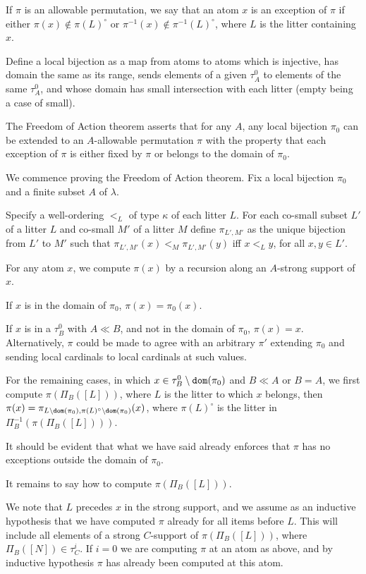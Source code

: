 \documentclass[12pt]{article}
\begin{document}
If $\pi$ is an allowable permutation, we say that an atom $x$ is
an exception of $\pi$ if either $\pi(x) \not\in \pi(L)^{\circ}$ or $\pi^{-1}(x) \not\in \pi^{-1}(L)^\circ$, where $L$ is the litter containing $x$.

Define a local bijection as a map from atoms to atoms which is injective, has domain the same as its range,  sends elements of a given $\tau^0_A$ to elements of the same
$\tau^0_A$, and whose domain has small intersection with each litter (empty being a case of small).



The Freedom of Action theorem asserts that for any $A$, any local bijection $\pi_0$ %
can be extended to an $A$-allowable permutation $\pi$ with the property that each exception of $\pi$ is either
fixed by $\pi$ or belongs to the domain of $\pi_0$.

We commence proving the Freedom of Action theorem.  Fix a local bijection $\pi_0$ and a finite subset $A$ of $\lambda$. 

Specify a well-ordering $<_L$ of type $\kappa$ of each litter $L$.  For each co-small subset $L'$ of a litter $L$ and co-small $M'$ of a litter $M$ define $\pi_{L',M'}$ as
the unique bijection from $L'$ to $M'$ such that $\pi_{L',M'}(x) <_M \pi_{L',M'}(y)$ iff $x <_L y$, for all $x,y \in L'$.  

For any atom $x$, we compute $\pi(x)$ by a recursion along an $A$-strong support of $x$. 

If $x$ is in the domain of $\pi_0$, $\pi(x) = \pi_0(x)$.

If $x$ is in a $\tau^0_B$ with $A \ll B$, and not in the domain of $\pi_0$, $\pi(x)=x$.  Alternatively, $\pi$ could be made to agree with an arbitrary $\pi'$ extending $\pi_0$ and sending local cardinals to local cardinals at such values.

For the remaining cases, in which $x \in \tau^0_B \setminus {\tt dom}(\pi_0)$ and $B \ll A$ or $B=A$, we first compute $\pi(\Pi_B([L]))$, where $L$ is the litter to which $x$ belongs,
then $\pi(x) = \pi_{L \setminus {\tt dom}(\pi_0),\pi(L)^\circ \setminus {\tt dom}(\pi_0)}(x)$, where $\pi(L)^\circ$ is the litter in $\Pi_B^{-1}(\pi(\Pi_B([L])))$.

It should be evident that what we have said already enforces that $\pi$ has no exceptions outside the domain of $\pi_0$.

It remains to say how to compute $\pi(\Pi_B([L]))$.

We note that $L$ precedes $x$ in the strong support, and we assume as an inductive hypothesis that we have computed $\pi$ already for all items before $L$.
This will include all elements of a strong $C$-support of $\pi(\Pi_B([L]))$, where $\Pi_B([N]) \in \tau^i_C$.  If $i=0$ we are computing $\pi$ at an atom as above, and
by inductive hypothesis $\pi$ has already been computed at this atom.
\end{document}
